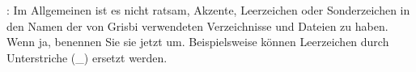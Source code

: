 \Attention{}: Im Allgemeinen ist es nicht ratsam, Akzente, Leerzeichen oder Sonderzeichen in den Namen der von Grisbi verwendeten Verzeichnisse und Dateien zu haben. Wenn ja, benennen Sie sie jetzt um. Beispielsweise können Leerzeichen durch Unterstriche (\_) ersetzt werden.
